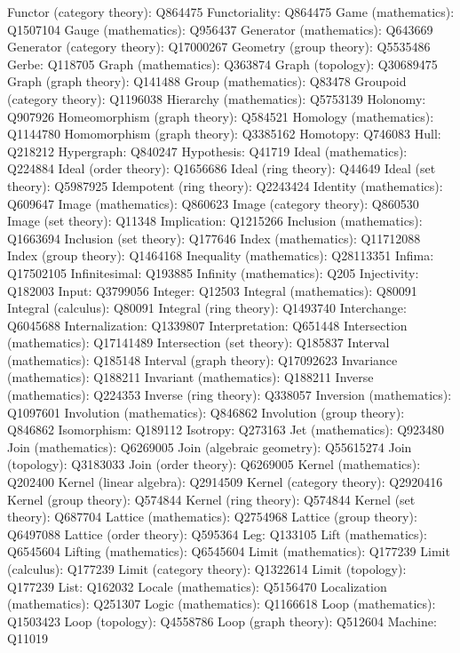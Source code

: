 Functor (category theory): Q864475
Functoriality: Q864475
Game (mathematics): Q1507104
Gauge (mathematics): Q956437
Generator (mathematics): Q643669
Generator (category theory): Q17000267
Geometry (group theory): Q5535486
Gerbe: Q118705
Graph (mathematics): Q363874
Graph (topology): Q30689475
Graph (graph theory): Q141488
Group (mathematics): Q83478
Groupoid (category theory): Q1196038
Hierarchy (mathematics): Q5753139
Holonomy: Q907926
Homeomorphism (graph theory): Q584521
Homology (mathematics): Q1144780
Homomorphism (graph theory): Q3385162
Homotopy: Q746083
Hull: Q218212
Hypergraph: Q840247
Hypothesis: Q41719
Ideal (mathematics): Q224884
Ideal (order theory): Q1656686
Ideal (ring theory): Q44649
Ideal (set theory): Q5987925
Idempotent (ring theory): Q2243424
Identity (mathematics): Q609647
Image (mathematics): Q860623
Image (category theory): Q860530
Image (set theory): Q11348
Implication: Q1215266
Inclusion (mathematics): Q1663694
Inclusion (set theory): Q177646
Index (mathematics): Q11712088
Index (group theory): Q1464168
Inequality (mathematics): Q28113351
Infima: Q17502105
Infinitesimal: Q193885
Infinity (mathematics): Q205
Injectivity: Q182003
Input: Q3799056
Integer: Q12503
Integral (mathematics): Q80091
Integral (calculus): Q80091
Integral (ring theory): Q1493740
Interchange: Q6045688
Internalization: Q1339807
Interpretation: Q651448
Intersection (mathematics): Q17141489
Intersection (set theory): Q185837
Interval (mathematics): Q185148
Interval (graph theory): Q17092623
Invariance (mathematics): Q188211
Invariant (mathematics): Q188211
Inverse (mathematics): Q224353
Inverse (ring theory): Q338057
Inversion (mathematics): Q1097601
Involution (mathematics): Q846862
Involution (group theory): Q846862
Isomorphism: Q189112
Isotropy: Q273163
Jet (mathematics): Q923480
Join (mathematics): Q6269005
Join (algebraic geometry): Q55615274
Join (topology): Q3183033
Join (order theory): Q6269005
Kernel (mathematics): Q202400
Kernel (linear algebra): Q2914509
Kernel (category theory): Q2920416
Kernel (group theory): Q574844
Kernel (ring theory): Q574844
Kernel (set theory): Q687704
Lattice (mathematics): Q2754968
Lattice (group theory): Q6497088
Lattice (order theory): Q595364
Leg: Q133105
Lift (mathematics): Q6545604
Lifting (mathematics): Q6545604
Limit (mathematics): Q177239
Limit (calculus): Q177239
Limit (category theory): Q1322614
Limit (topology): Q177239
List: Q162032
Locale (mathematics): Q5156470
Localization (mathematics): Q251307
Logic (mathematics): Q1166618
Loop (mathematics): Q1503423
Loop (topology): Q4558786
Loop (graph theory): Q512604
Machine: Q11019
